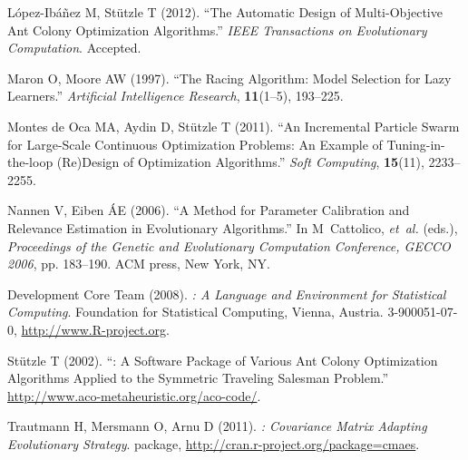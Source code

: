 \documentclass[article,a4paper,nojss,notitle]{jss}
\newcommand{\SoftwarePackage}{\pkg}
\begin{document}
\begin{thebibliography}{34}

L{\'o}pez-Ib{\'a}{\~n}ez M, St{\"u}tzle T (2012).
\newblock \enquote{The Automatic Design of Multi-Objective Ant Colony
  Optimization Algorithms.}
\newblock \emph{IEEE Transactions on Evolutionary Computation}.
\newblock Accepted.

Maron O, Moore AW (1997).
\newblock \enquote{The Racing Algorithm: {M}odel Selection for Lazy Learners.}
\newblock \emph{Artificial Intelligence Research}, \textbf{11}(1--5), 193--225.

{Montes de Oca} MA, Aydin D, St{\"u}tzle T (2011).
\newblock \enquote{An Incremental Particle Swarm for Large-Scale Continuous
  Optimization Problems: An Example of Tuning-in-the-loop (Re)Design of
  Optimization Algorithms.}
\newblock \emph{Soft Computing}, \textbf{15}(11), 2233--2255.

Nannen V, Eiben {\'A}E (2006).
\newblock \enquote{A Method for Parameter Calibration and Relevance Estimation
  in Evolutionary Algorithms.}
\newblock In M~Cattolico, \emph{et~al.} (eds.), \emph{Proceedings of the
  Genetic and Evolutionary Computation Conference, GECCO 2006}, pp. 183--190.
  ACM press, New York, NY.

{ Development Core Team} (2008).
\newblock \emph{: A Language and Environment for Statistical
  Computing}.
\newblock {} Foundation for Statistical Computing, Vienna, Austria.
 3-900051-07-0, 
\urlprefix\url{http://www.R-project.org}.

St{\"u}tzle T (2002).
\newblock \enquote{{\SoftwarePackage{ACOTSP}}: A Software Package of Various
  Ant Colony Optimization Algorithms Applied to the Symmetric Traveling
  Salesman Problem.}
\newblock \urlprefix\url{http://www.aco-metaheuristic.org/aco-code/}.

Trautmann H, Mersmann O, Arnu D (2011).
\newblock \emph{{}: Covariance Matrix Adapting Evolutionary
  Strategy}.
\newblock {} package,
  \urlprefix\url{http://cran.r-project.org/package=cmaes}.

\end{thebibliography}
\end{document}
